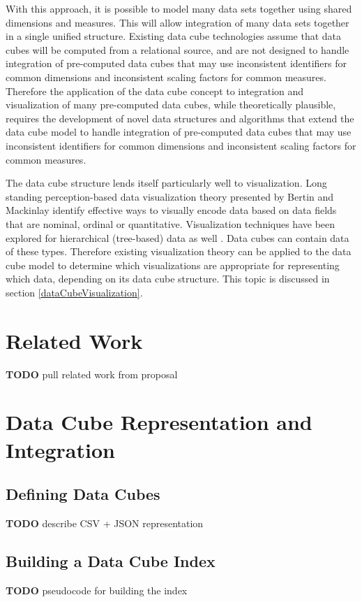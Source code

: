 \documentclass[12pt]{article}
\newcommand{\TODO}[1]{{ \color{red}\textbf{TODO} #1 }}
\begin{document}
\begin{doublespace}
With this approach, it is possible to model many data sets together using shared dimensions and measures. This will allow integration of many data sets together in a single unified structure. Existing data cube technologies assume that data cubes will be computed from a relational source, and are not designed to handle integration of pre-computed data cubes that may use inconsistent identifiers for common dimensions and inconsistent scaling factors for common measures. Therefore the application of the data cube concept to integration and visualization of many pre-computed data cubes, while theoretically plausible, requires the development of novel data structures and algorithms that extend the data cube model to handle integration of pre-computed data cubes that may use inconsistent identifiers for common dimensions and inconsistent scaling factors for common measures.


The data cube structure lends itself particularly well to visualization. Long standing perception-based data visualization theory presented by Bertin \cite{bertin1983semiology} and Mackinlay \cite{mackinlay1986automating} identify effective ways to visually encode data based on data fields that are nominal, ordinal or quantitative. Visualization techniques have been explored for hierarchical (tree-based) data as well \cite{graham2010survey}. Data cubes can contain data of these types. Therefore existing visualization theory can be applied to the data cube model to determine which visualizations are appropriate for representing which data, depending on its data cube structure. This topic is discussed in section \ref{dataCubeVisualization}.

\pagebreak
\section{Related Work}
\TODO{pull related work from proposal}

\pagebreak
\section{Data Cube Representation and Integration}
\subsection{Defining Data Cubes}
\TODO{describe CSV + JSON representation}
\subsection{Building a Data Cube Index}
\TODO{ pseudocode for building the index}

\end{doublespace}
\end{document}
